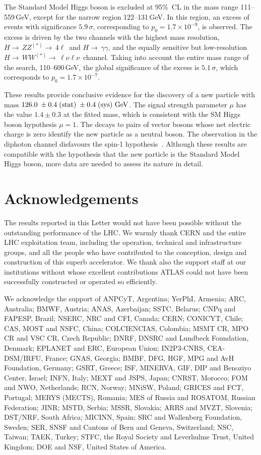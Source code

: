 \documentclass[final,3p,times,twocolumn]{elsarticle}
\newcommand{\hgg}{\ensuremath{H{\rightarrow\,}\gamma\gamma}}
\newcommand{\hWWlnln}{\ensuremath{H{\rightarrow\,}WW^{(*)}{\rightarrow\,}\ell\nu\ell\nu}}
\newcommand\htollll{$H{\rightarrow\,}ZZ^{(*)}{\rightarrow\,}4\ell$}
\newcommand{\lowerlowerObsNoGeV}{111}
\newcommand{\upperlowerObsNoGeV}{122}
\newcommand{\lowerObsNoGeV}{131}
\newcommand{\lowerObs}{\lowerObsNoGeV\,GeV}
\newcommand{\upperObsNoGeV}{559}
\newcommand{\upperObs}{\upperObsNoGeV\,GeV}
\newcommand{\significanceESS}{$5.9\,\sigma$}
\newcommand{\masspeak}{126.0}
\newcommand{\massresultStatSys}{\mbox{\ensuremath{\masspeak \; \pm 0.4 \;\textrm{(stat)} \; \pm 0.4\; \textrm{(sys)}~\mathrm{GeV}}}}
\begin{document}
The Standard Model Higgs boson is excluded at 95\%\ CL
in the mass range \lowerlowerObsNoGeV --\upperObs, except for the
narrow region \upperlowerObsNoGeV --\lowerObs. In this region, an
excess of events with significance \significanceESS, corresponding
to $p_0=1.7\times 10^{-9}$, is observed. The excess is driven
by the two channels with the highest mass resolution, 
\htollll\ and \hgg, and the equally sensitive but low-resolution \hWWlnln\ channel.
Taking into account the entire mass range of the search,  110--600\,GeV,
the global significance of the excess is $5.1\,\sigma$, which corresponds
to $p_0=1.7\times 10^{-7}$.

These results provide conclusive evidence for the discovery of a new 
particle with mass $\massresultStatSys$. The signal strength parameter $\mu$
has the value $1.4\pm 0.3$ at the fitted mass,
which is consistent with the SM Higgs boson hypothesis $\mu=1$.
The decays to pairs of vector 
bosons whose net electric charge is zero identify the new particle as a neutral 
boson.
The observation in the  diphoton channel disfavours the spin-1 
hypothesis~\cite{landau1948,yang1950}. 
Although these  results are compatible with the hypothesis that the new particle is the 
Standard Model Higgs boson, more data are needed to assess its nature in detail.


\section*{Acknowledgements}

The results reported in this Letter would not have been possible without the
outstanding performance of the LHC. We warmly thank CERN and the entire LHC exploitation team, including 
the operation, technical and infrastructure groups, and all the people who have contributed to 
the conception, design and construction of this superb accelerator.
We thank also the support staff at our institutions without whose excellent contributions ATLAS could
not have been successfully constructed or operated so efficiently. 

We acknowledge the support of ANPCyT, Argentina; YerPhI, Armenia; ARC,
Australia; BMWF, Austria; ANAS, Azerbaijan; SSTC, Belarus; CNPq and FAPESP,
Brazil; NSERC, NRC and CFI, Canada; CERN; CONICYT, Chile; CAS, MOST and NSFC,
China; COLCIENCIAS, Colombia; MSMT CR, MPO CR and VSC CR, Czech Republic;
DNRF, DNSRC and Lundbeck Foundation, Denmark; EPLANET and ERC, European Union;
IN2P3-CNRS, CEA-DSM/IRFU, France; GNAS, Georgia; BMBF, DFG, HGF, MPG and AvH
Foundation, Germany; GSRT, Greece; ISF, MINERVA, GIF, DIP and Benoziyo Center,
Israel; INFN, Italy; MEXT and JSPS, Japan; CNRST, Morocco; FOM and NWO,
Netherlands; RCN, Norway; MNiSW, Poland; GRICES and FCT, Portugal; MERYS
(MECTS), Romania; MES of Russia and ROSATOM, Russian Federation; JINR; MSTD,
Serbia; MSSR, Slovakia; ARRS and MVZT, Slovenia; DST/NRF, South Africa;
MICINN, Spain; SRC and Wallenberg Foundation, Sweden; SER, SNSF and Cantons of
Bern and Geneva, Switzerland; NSC, Taiwan; TAEK, Turkey; STFC, the Royal
Society and Leverhulme Trust, United Kingdom; DOE and NSF, United States of
America.
\end{document}
